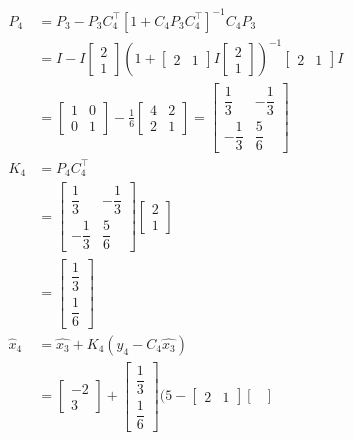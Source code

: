 \documentclass[letterpaper]{article}
\begin{document}
\begin{enumerate}
\begin{enumerate}
$$\begin{aligned} P_4 &= P_3 - P_3 C_4^\top [1+C_4 P_3 C_4^\top]^{-1}C_4 P_3 \\
&= I - I \begin{bmatrix} 2 \\ 1 \end{bmatrix}(1+\left[\begin{array}{cc} 2 & 1\end{array}\right] I \begin{bmatrix} 2 \\ 1 \end{bmatrix})^{-1} \left[\begin{array}{cc} 2 & 1\end{array}\right]I \\
&= \left[\begin{array}{cc} 1 & 0 \\ 0 & 1\end{array}\right] - \frac{1}{6}\left[\begin{array}{cc} 4 & 2 \\ 2 & 1 \end{array}\right] = \left[\begin{array}{cc} \dfrac{1}{3} & -\dfrac{1}{3}\\[2ex]-\dfrac{1}{3} & \dfrac{5}{6}\end{array}\right] \\ K_4 &= P_4 C_4^\top\\
&= \left[\begin{array}{cc} \dfrac{1}{3} & -\dfrac{1}{3}\\[2ex]-\dfrac{1}{3} & \dfrac{5}{6}\end{array}\right]\begin{bmatrix} 2 \\ 1 \end{bmatrix}\\
&= \begin{bmatrix} \dfrac{1}{3} \\[2ex] \dfrac{1}{6}\end{bmatrix}\\
\widehat{x}_4 &= \hat{x_3}+K_4(y_4 - C_4 \hat{x_3})\\
&= \begin{bmatrix} -2\\3\end{bmatrix} + \begin{bmatrix} \dfrac{1}{3} \\[2ex] \dfrac{1}{6}\end{bmatrix} (5-\left[\begin{array}{cc} 2 & 1\end{array}\right]\begin{bmatrix}

\end{bmatrix}
\end{aligned}$$
\end{enumerate}
\end{enumerate}
\end{document}

